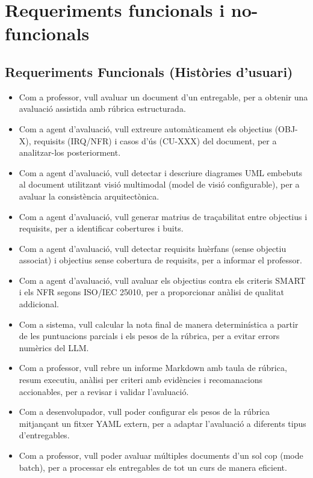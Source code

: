 \documentclass[12pt,a4paper,twoside]{report}
\begin{document}
\section{Requeriments funcionals i no-funcionals}
\label{sec:requeriments}

\subsection{Requeriments Funcionals (Hist\`ories d'usuari)}
\label{subsec:req-funcionals}

\begin{itemize}
    \item Com a professor, vull avaluar un document d'un entregable, per a obtenir una avaluaci\'o assistida amb r\'ubrica estructurada.
    \item Com a agent d'avaluaci\'o, vull extreure autom\`aticament els objectius (OBJ-X), requisits (IRQ/NFR) i casos d'\'us (CU-XXX) del document, per a analitzar-los posteriorment.
    \item Com a agent d'avaluaci\'o, vull detectar i descriure diagrames UML embebuts al document utilitzant visi\'o multimodal (model de visi\'o configurable), per a avaluar la consist\`encia arquitect\`onica.
    \item Com a agent d'avaluaci\'o, vull generar matrius de tra\c{c}abilitat entre objectius i requisits, per a identificar cobertures i buits.
    \item Com a agent d'avaluaci\'o, vull detectar requisits hu\`erfans (sense objectiu associat) i objectius sense cobertura de requisits, per a informar el professor.
    \item Com a agent d'avaluaci\'o, vull avaluar els objectius contra els criteris SMART i els NFR segons ISO/IEC 25010, per a proporcionar an\`alisi de qualitat addicional.
    \item Com a sistema, vull calcular la nota final de manera determin\'istica a partir de les puntuacions parcials i els pesos de la r\'ubrica, per a evitar errors num\`erics del LLM.
    \item Com a professor, vull rebre un informe Markdown amb taula de r\'ubrica, resum executiu, an\`alisi per criteri amb evid\`encies i recomanacions accionables, per a revisar i validar l'avaluaci\'o.
    \item Com a desenvolupador, vull poder configurar els pesos de la r\'ubrica mitjan\c{c}ant un fitxer YAML extern, per a adaptar l'avaluaci\'o a diferents tipus d'entregables.
    \item Com a professor, vull poder avaluar m\'ultiples documents d'un sol cop (mode batch), per a processar els entregables de tot un curs de manera eficient.

\end{itemize}
\end{document}
